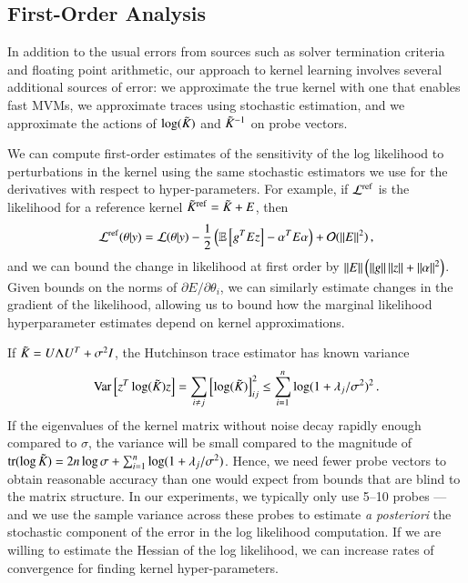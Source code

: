\subsection{First-Order Analysis}
In addition to the usual errors from sources such as solver termination criteria
and floating point arithmetic, our approach to kernel learning involves several
additional sources of error: we approximate the true kernel with one that
enables fast MVMs, we approximate traces using stochastic estimation, and we
approximate the actions of $\log(\tilde{K}_{})$ and $\tilde{K}_{}^{-1}$ on probe
vectors.

We can compute first\hyp{}order estimates of the sensitivity of the log
likelihood to perturbations in the kernel using the same stochastic estimators
we use for the derivatives with respect to hyper\hyp{}parameters. For example,
if $\mathcal{L}^{\operatorname{ref}}$ is the likelihood for a reference kernel $\tilde{K}_{}^{\operatorname{ref}} =
\tilde{K}_{} + E$, then
\begin{equation}
  \mathcal{L}^{\operatorname{ref}}(\theta|y) = \mathcal{L}(\theta|y) - \frac{1}{2} \left(\operatorname{\mathbb{E}}\left
  [g^TEz\right] - \alpha^T E \alpha \right) + \mathcal{O}(\left\lVert E\right\rVert^2)\,,
\end{equation}
and we can bound the change in likelihood at first order by $\left\lVert E\right\rVert\left(
\left\lVert g\right\rVert\left\lVert z\right\rVert + \left\lVert\alpha\right\rVert^2 \right)$. Given bounds on the norms of
$\partial E/\partial \theta_i$, we can similarly estimate changes in the
gradient of the likelihood, allowing us to bound how the marginal likelihood
hyperparameter estimates depend on kernel approximations.

If $\tilde{K}_{} = U \Lambda U^T + \sigma^2 I$, the Hutchinson trace estimator has
known variance~\cite{Avron:2011:Randomized}
\begin{equation}
  \operatorname{Var}\left[z^T \log(\tilde{K}_{}) z\right] = \sum_{i \neq j} \left[\log(\tilde{K}_{})\right]_{ij}^2 \leq \sum_{i=1}^n \log(1 + \lambda_j/\sigma^2)^2\,.
\end{equation}
If the eigenvalues of the kernel matrix without noise decay rapidly enough
compared to $\sigma$, the variance will be small compared to the magnitude of
$\operatorname{tr}(\log \tilde{K}_{}) = 2n\log \sigma + \sum_{i=1}^n\log(1+\lambda_j/\sigma^2)$.
Hence, we need fewer probe vectors to obtain reasonable accuracy than one would
expect from bounds that are blind to the matrix structure. In our experiments,
we typically only use 5--10 probes --- and we use the sample variance across
these probes to estimate {\em a posteriori} the stochastic component of the
error in the log likelihood computation.  If we are willing to estimate the
Hessian of the log likelihood, we can increase rates of convergence for finding
kernel hyper\hyp{}parameters.

